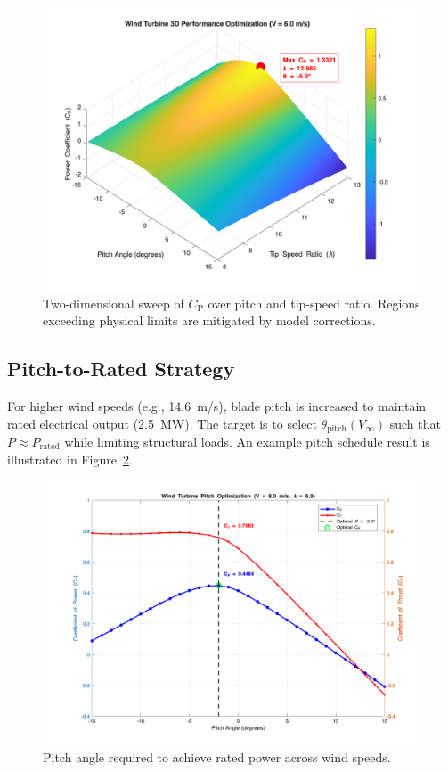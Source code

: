\documentclass[11pt]{article}
\begin{document}
\begin{figure}[h]
  \centering
  \includegraphics[width=0.95\linewidth]{../../2D_CP_Optimization_Results.png}
  \caption{Two-dimensional sweep of \(C_\mathrm{P}\) over pitch and tip-speed ratio. Regions exceeding physical limits are mitigated by model corrections.}
  \label{fig:cp_2d}
\end{figure}

\subsection{Pitch-to-Rated Strategy}
For higher wind speeds (e.g., \SI{14.6}{m/s}), blade pitch is increased to maintain rated electrical output (\SI{2.5}{MW}). The target is to select \(\theta_\mathrm{pitch}(V_\infty)\) such that \(P\approx P_\mathrm{rated}\) while limiting structural loads. An example pitch schedule result is illustrated in Figure~\ref{fig:pitch_to_rated}.

\begin{figure}[h]
  \centering
  \includegraphics[width=0.9\linewidth]{../../Pitch_Optimization_Results.png}
  \caption{Pitch angle required to achieve rated power across wind speeds.}
  \label{fig:pitch_to_rated}
\end{figure}
\end{document}
